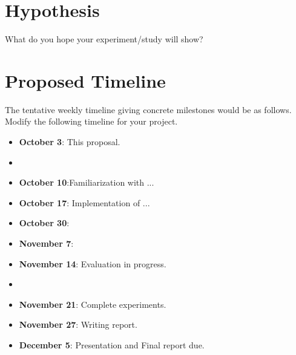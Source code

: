\documentclass[10pt]{article}
\theoremstyle{plain}
\theoremstyle{definition}
\theoremstyle{remark}
\begin{document}
\section{Hypothesis}

What do you hope your experiment/study will show?

\clearpage
\section{Proposed Timeline}
The tentative weekly timeline giving concrete milestones would be as follows. Modify the following timeline for your project.

\begin{itemize}
\item {\bf October 3}: This proposal.
\item
\item {\bf October 10}:Familiarization with ...
\item {\bf October 17}: Implementation of ...
\item {\bf October 30}:
\item {\bf November 7}:
\item {\bf November 14}: Evaluation in progress.
\item
\item {\bf November 21}: Complete experiments.
\item {\bf November 27}: Writing report.
\item {\bf December 5}: Presentation and Final report due.

\end{itemize}




% 
\end{document}
